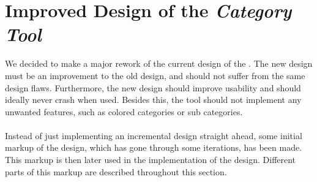 \section{Improved Design of the \emph{Category Tool}}
\label{sec:improved_design}

We decided to make a major rework of the current design of the \ct. The new design must be an improvement to the old design, and should not suffer from the same design flaws. Furthermore, the new design should improve usability and should ideally never crash when used.  Besides this, the tool should not implement any unwanted features, such as colored categories or sub categories.
\\\\
Instead of just implementing an incremental design straight ahead, some initial markup of the design, which has gone through some iterations, has been made. This markup is then later used in the implementation of the design. Different parts of this markup are described throughout this section.

